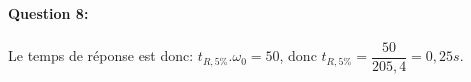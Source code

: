 \paragraph{Question 8:}

Le temps de réponse est donc: $t_{R,5\%}.\omega_0=50$, donc $t_{R,5\%}=\dfrac{50}{205,4}=0,25s$.

%
%
%
%
%
%
%
%
%
%
%
%
%
%
%
%
%
%
%
%
%
%

